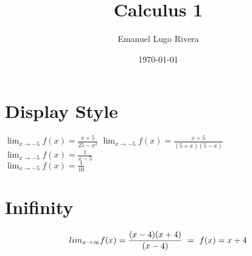 \documentclass[a4paper,12pt]{article}
\title{Calculus 1}
\author{Emanuel Lugo Rivera}
\date{\today}
\begin{document}
\begin{titlepage}
    \maketitle
\end{titlepage}

\section{Display Style}
$\displaystyle{\lim_{x \to -5}}f(x)=\frac{x+5}{25-x^2}$ 
$\displaystyle\lim_{x\to-5} f(x)=\frac{x+5}{(5+x)(5-x)}$
$\displaystyle \lim_{x\to-5} f(x)=\frac{1}{x-5}$ \\

$\displaystyle \lim_{x\to-5} f(x)=\frac{1}{10}$\\


\section{Inifinity}
\[\\lim_{x\to\infty}f(x)=\frac{(x-4)(x+4)}{(x-4)} \ \
\\ = \ f(x)=x+4\]
\end{document}
